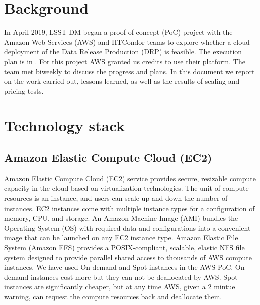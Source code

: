 \newcommand{\poc}{AWS PoC}





\section{Background}

In April 2019, LSST DM began a proof of concept (PoC) project with the Amazon Web Services (AWS) and HTCondor teams to explore whether a cloud deployment of the Data Release Production (DRP) is feasible.
The execution plan is in .
For this project AWS granted us credits to use their platform.
The team met biweekly to discuss the progress and plans.
In this document we report on the work carried out, lessons learned, as well as the results of scaling and pricing tests.


\section{Technology stack}

\subsection{Amazon Elastic Compute Cloud (EC2)}

\href{https://aws.amazon.com/ec2/}{Amazon Elastic Compute Cloud (EC2)} service provides secure, resizable compute capacity in the cloud based on virtualization technologies.
The unit of compute resources is an instance, and users can scale up and down the number of instances.
EC2 instances come with multiple instance types for a configuration of memory, CPU, and storage.
An Amazon Machine Image (AMI) bundles the Operating System (OS) with required data and configurations into a convenient image that can be launched on any EC2 instance type.
\href{https://aws.amazon.com/efs/}{Amazon Elastic File System (Amazon EFS)} provides a POSIX-compliant, scalable, elastic NFS file system designed to provide parallel shared access to thousands of AWS compute instances.
We have used On-demand and Spot instances in the \poc.
On demand instances cost more but they can not be deallocated by AWS. Spot instances are significantly cheaper, but at any time AWS, given a 2 mintue warning, can request the compute resources back and deallocate them.

